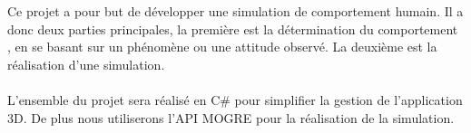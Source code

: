 Ce projet a pour but de développer une simulation de comportement humain. Il a
donc deux parties principales, la première est la détermination du comportement
, en se basant sur un phénomène ou une attitude observé. La deuxième est la
réalisation d'une simulation.

\paragraph{}

L'ensemble du projet sera réalisé en C\# pour simplifier la gestion de
l'application 3D. De plus nous utiliserons l'API MOGRE pour la réalisation de la
simulation.

